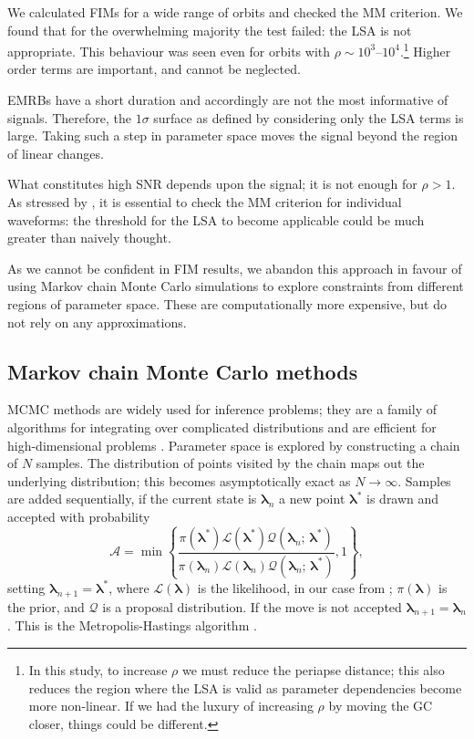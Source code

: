 We calculated FIMs for a wide range of orbits and checked the MM criterion. We found that for the overwhelming majority the test failed: the LSA is not appropriate. This behaviour was seen even for orbits with $\rho \sim 10^3$--$10^4$.\footnote{In this study, to increase $\rho$ we must reduce the periapse distance; this also reduces the region where the LSA is valid as parameter dependencies become more non-linear. If we had the luxury of increasing $\rho$ by moving the GC closer, things could be different.} Higher order terms are important, and cannot be neglected.

EMRBs have a short duration and accordingly are not the most informative of signals. Therefore, the $1\sigma$ surface as defined by considering only the LSA terms is large. Taking such a step in parameter space moves the signal beyond the region of linear changes.

What constitutes high SNR depends upon the signal; it is not enough for $\rho > 1$. As stressed by \citet{Vallisneri2008}, it is essential to check the MM criterion for individual waveforms: the threshold for the LSA to become applicable could be much greater than naively thought.

As we cannot be confident in FIM results, we abandon this approach in favour of using Markov chain Monte Carlo simulations to explore constraints from different regions of parameter space. These are computationally more expensive, but do not rely on any approximations.

\subsection{Markov chain Monte Carlo methods}\label{sec:MCMC}

MCMC methods are widely used for inference problems; they are a family of algorithms for integrating over complicated distributions and are efficient for high-dimensional problems \citep[chapter 29]{MacKay2003}. Parameter space is explored by constructing a chain of $N$ samples. The distribution of points visited by the chain maps out the underlying distribution; this becomes asymptotically exact as $N \rightarrow \infty$. Samples are added sequentially, if the current state is $\boldsymbol{\lambda}_n$ a new point $\boldsymbol{\lambda}^\ast$ is drawn and accepted with probability
\begin{equation}
\mathcal{A} = \min\left\{\frac{\pi(\boldsymbol{\lambda}^\ast)\mathcal{L}(\boldsymbol{\lambda}^\ast)\mathcal{Q}(\boldsymbol{\lambda}_n;\,\boldsymbol{\lambda}^\ast)}{\pi(\boldsymbol{\lambda}_n)\mathcal{L}(\boldsymbol{\lambda}_n)\mathcal{Q}(\boldsymbol{\lambda}_n;\,\boldsymbol{\lambda}^\ast)}, 1\right\},
\end{equation}
setting $\boldsymbol{\lambda}_{n + 1} = \boldsymbol{\lambda}^\ast$, where $\mathcal{L}(\boldsymbol{\lambda})$ is the likelihood, in our case from ; $\pi(\boldsymbol{\lambda})$ is the prior, and $\mathcal{Q}$ is a proposal distribution. If the move is not accepted  $\boldsymbol{\lambda}_{n + 1} = \boldsymbol{\lambda}_n$. This is the Metropolis-Hastings algorithm \citep{Metropolis1953,Hastings1970}.

